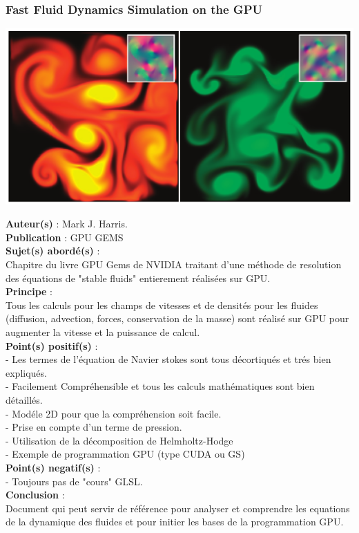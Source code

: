 \documentclass[a4paper,10pt]{article}
\begin{document}
\subsubsection{Fast Fluid Dynamics Simulation on the GPU}
    \begin{center}
	\includegraphics[scale=0.5]{FastGPU.ps}
    \end{center}
\textbf{Auteur(s)} : Mark J. Harris.\\
\textbf{Publication} : GPU GEMS \\
\textbf{Sujet(s) abordé(s)} : \\ 
	Chapitre du livre GPU Gems de NVIDIA traitant d'une méthode de resolution des équations de "stable fluids" entierement réalisées sur GPU.\\
\textbf{Principe} :\\	
	Tous les calculs pour les champs de vitesses et de densités pour les fluides (diffusion, advection, forces, conservation de la masse) sont réalisé sur GPU pour augmenter la vitesse et la puissance de calcul.\\
\textbf{Point(s) positif(s)} :\\
	- Les termes de l'équation de Navier stokes sont tous décortiqués et trés bien expliqués.\\
	- Facilement Compréhensible et tous les calculs mathématiques sont bien détaillés.\\
	- Modéle 2D pour que la compréhension soit facile.\\
	- Prise en compte d'un terme de pression.\\
	- Utilisation de la décomposition de Helmholtz-Hodge\\
	- Exemple de programmation GPU (type CUDA ou GS)\\
\textbf{Point(s) negatif(s)} :\\
	- Toujours pas de "cours" GLSL.\\
\textbf{Conclusion} :\\
	Document qui peut servir de référence pour analyser et comprendre les equations de la dynamique des fluides et pour initier les bases de la programmation GPU.\\
\end{document}
